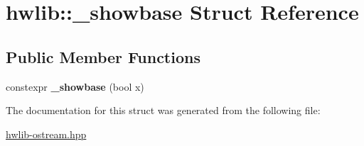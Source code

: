 \hypertarget{structhwlib_1_1__showbase}{}\section{hwlib\+:\+:\+\_\+showbase Struct Reference}
\label{structhwlib_1_1__showbase}
\subsection*{Public Member Functions}
\begin{DoxyCompactItemize}
\item 
constexpr {\bfseries \+\_\+showbase} (bool x)\hypertarget{structhwlib_1_1__showbase_aa9dd5a4b597e34ae374859798a7a3c2d}{}\label{structhwlib_1_1__showbase_aa9dd5a4b597e34ae374859798a7a3c2d}

\end{DoxyCompactItemize}


The documentation for this struct was generated from the following file\+:\begin{DoxyCompactItemize}
\item 
\hyperlink{hwlib-ostream_8hpp}{hwlib-\/ostream.\+hpp}\end{DoxyCompactItemize}
